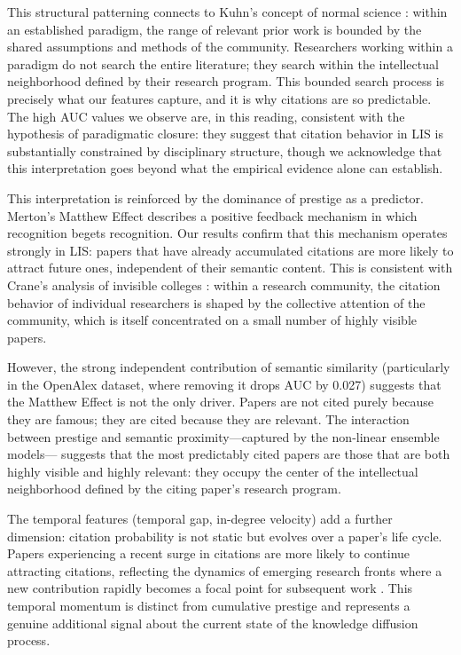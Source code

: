 \documentclass[12pt,a4paper]{article}
\begin{document}
This structural patterning connects to Kuhn's concept of normal science
\citep{kuhn1962structure}: within an established paradigm, the range of relevant
prior work is bounded by the shared assumptions and methods of the community.
Researchers working within a paradigm do not search the entire literature; they
search within the intellectual neighborhood defined by their research program.
This bounded search process is precisely what our features capture, and it is why
citations are so predictable. The high AUC values we observe are, in this reading,
consistent with the hypothesis of paradigmatic closure: they suggest that
citation behavior in LIS is substantially constrained by disciplinary structure,
though we acknowledge that this interpretation goes beyond what the empirical
evidence alone can establish.

This interpretation is reinforced by the dominance of prestige as a predictor.
Merton's Matthew Effect \citep{merton1968matthew} describes a positive feedback
mechanism in which recognition begets recognition. Our results confirm that this
mechanism operates strongly in LIS: papers that have already accumulated citations
are more likely to attract future ones, independent of their semantic content.
This is consistent with Crane's analysis of invisible colleges
\citep{crane1972invisible}: within a research community, the citation behavior of
individual researchers is shaped by the collective attention of the community,
which is itself concentrated on a small number of highly visible papers.

However, the strong independent contribution of semantic similarity (particularly
in the OpenAlex dataset, where removing it drops AUC by 0.027) suggests that the
Matthew Effect is not the only driver. Papers are not cited purely because they
are famous; they are cited because they are relevant. The interaction between
prestige and semantic proximity---captured by the non-linear ensemble models---
suggests that the most predictably cited papers are those that are both highly
visible and highly relevant: they occupy the center of the intellectual neighborhood
defined by the citing paper's research program.

The temporal features (temporal gap, in-degree velocity) add a further dimension:
citation probability is not static but evolves over a paper's life cycle. Papers
experiencing a recent surge in citations are more likely to continue attracting
citations, reflecting the dynamics of emerging research fronts where a new
contribution rapidly becomes a focal point for subsequent work \citep{redner2005citation}.
This temporal momentum is distinct from cumulative prestige and represents a genuine
additional signal about the current state of the knowledge diffusion process.
\end{document}
